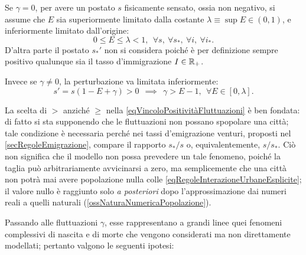         \begin{ipo}
          \label{ipLimitiTassoEmigrazione}
          Se \(\gamma=0\), per avere un postato \(s\) fisicamente sensato, ossia non negativo, si assume che \(E\) sia superiormente limitato dalla costante \(\lambda\equiv\sup E\in(0,1)\), e inferiormente limitato dall'origine:
          \begin{equation*}
            0\leq E\leq\lambda<1,\ \ \forall s,\ \forall s_*,\ \forall i,\ \forall i_*.
          \end{equation*}
          D'altra parte il postato \(s_*'\) non si considera poiché è per definizione sempre positivo qualunque sia il tasso d'immigrazione \(I\in\mathbb R_+\).
          
          Invece se \(\gamma\neq0\), la perturbazione va limitata inferiormente:
          \begin{equation}
            \label{eqVincoloPositivitàFluttuazioni}
            s'=s(1-E+\gamma)>0
            \ \ \implies\ \ 
            \gamma>E-1,
            \ \ \forall E\in[0,\lambda].
          \end{equation}
        \end{ipo}
        
        La scelta di \(>\) anziché \(\geq\) nella \eqref{eqVincoloPositivitàFluttuazioni} è ben fondata: di fatto si sta supponendo che le fluttuazioni non possano spopolare una città; tale condizione è necessaria perché nei tassi d'emigrazione venturi, proposti nel \cref{secRegoleEmigrazione}, compare il rapporto \(s_*/s\) o, equivalentemente, \(s/s_*\). Ciò non significa che il modello non possa prevedere un tale fenomeno, poiché la taglia può arbitrariamente avvicinarsi a zero, ma semplicemente che una città non potrà mai avere popolazione nulla colle \ref{eqRegoleInterazioneUrbaneEsplicite}; il valore nullo è raggiunto solo \textit{a posteriori} dopo l'approssimazione dai numeri reali a quelli naturali (\cref{ossNaturaNumericaPopolazione}).

        Passando alle fluttuazioni \(\gamma\), esse rappresentano a grandi linee quei fenomeni complessivi di nascita e di morte che vengono considerati ma non direttamente modellati; pertanto valgono le seguenti ipotesi:

